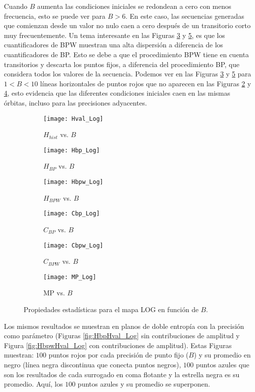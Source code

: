 Cuando $B$ aumenta las condiciones iniciales se redondean a cero con menos frecuencia, esto se puede ver para $B > 6$.
En este caso, las secuencias generadas que comienzan desde un valor no nulo caen a cero después de un transitorio corto muy frecuentemente.
Un tema interesante en las Figuras \ref{fig:Hbpw_Log} y \ref{fig:Cbpw_Log}, es que los cuantificadores de BPW muestran una alta dispersión a diferencia de los cuantificadores de BP.
Esto se debe a que el procedimiento BPW tiene en cuenta transitorios y descarta los puntos fijos, a diferencia del procedimiento BP, que considera todos los valores de la secuencia.
Podemos ver en las Figuras \ref{fig:Hbpw_Log} y \ref{fig:Cbpw_Log} para $1 < B < 10$ líneas horizontales de puntos rojos que no aparecen en las Figuras \ref{fig:Hbp_Log} y \ref{fig:Cbp_Log}, esto evidencia que las diferentes condiciones iniciales caen en las mismas órbitas, incluso para las precisiones adyacentes.
%
\begin{figure}[htpb]
	\centering
	\begin{subfigure}[b]{0.49\textwidth}
		\texttt{[image: Hval\_Log]}
		\caption{$H_{hist}$ vs. $B$}
		\label{fig:Hval_Log}
	\end{subfigure}
	\begin{subfigure}[b]{0.49\textwidth}
		\texttt{[image: Hbp\_Log]}
		\caption{$H_{BP}$ vs. $B$}
		\label{fig:Hbp_Log}
	\end{subfigure}
	\begin{subfigure}[b]{0.49\textwidth}
		\texttt{[image: Hbpw\_Log]}
		\caption{$H_{BPW}$ vs. $B$}
		\label{fig:Hbpw_Log}
	\end{subfigure}
	\begin{subfigure}[b]{0.49\textwidth}
		\texttt{[image: Cbp\_Log]}
		\caption{$C_{BP}$ vs. $B$}
		\label{fig:Cbp_Log}
	\end{subfigure}
	\begin{subfigure}[b]{0.49\textwidth}
		\texttt{[image: Cbpw\_Log]}
		\caption{$C_{BPW}$ vs. $B$}
		\label{fig:Cbpw_Log}
	\end{subfigure}
	\begin{subfigure}[b]{0.49\textwidth}
		\texttt{[image: MP\_Log]}
		\caption{MP vs. $B$}
		\label{fig:MP_Log}
	\end{subfigure}
	\caption{Propiedades estadísticas para el mapa LOG en función de $B$.}
	\label{fig:LOG_QuantiB}
\end{figure}

Los mismos resultados se muestran en planos de doble entropía con la precisión como parámetro (Figuras \ref{fig:HbpHval_Log} sin contribuciones de amplitud y Figura \ref{fig:HbpwHval_Log} con contribuciones de amplitud).
Estas Figuras muestran: $100$ puntos rojos por cada precisión de punto fijo ($B$) y su promedio en negro (línea negra discontinua que conecta puntos negros), $100$ puntos azules que son los resultados de cada surrogado en coma flotante y la estrella negra es su promedio.
Aquí, los $100$ puntos azules y su promedio se superponen.

